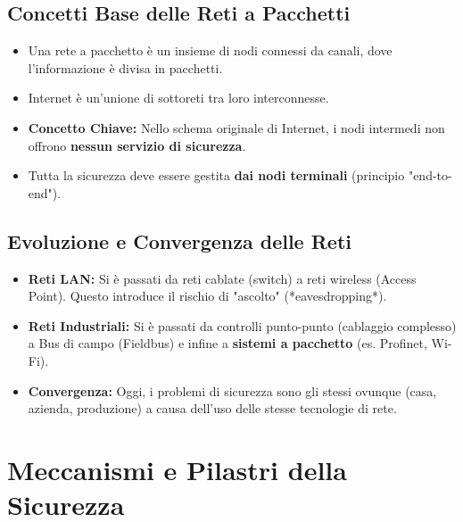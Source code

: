 \documentclass[a4paper,12pt]{article}
\begin{document}
\subsection{Concetti Base delle Reti a Pacchetti}
\begin{itemize}
    \item Una rete a pacchetto è un insieme di nodi connessi da canali, dove l'informazione è divisa in pacchetti.
    \item Internet è un'unione di sottoreti tra loro interconnesse.
    \item \textbf{Concetto Chiave:} Nello schema originale di Internet, i nodi intermedi non offrono \textbf{nessun servizio di sicurezza}.
    \item Tutta la sicurezza deve essere gestita \textbf{dai nodi terminali} (principio "end-to-end").
\end{itemize}

\subsection{Evoluzione e Convergenza delle Reti}
\begin{itemize}
    \item \textbf{Reti LAN:} Si è passati da reti cablate (switch) a reti wireless (Access Point). Questo introduce il rischio di "ascolto" (*eavesdropping*).
    \item \textbf{Reti Industriali:} Si è passati da controlli punto-punto (cablaggio complesso) a Bus di campo (Fieldbus) e infine a \textbf{sistemi a pacchetto} (es. Profinet, Wi-Fi).
    \item \textbf{Convergenza:} Oggi, i problemi di sicurezza sono gli stessi ovunque (casa, azienda, produzione) a causa dell'uso delle stesse tecnologie di rete.
\end{itemize}

\section{Meccanismi e Pilastri della Sicurezza}
\end{document}
